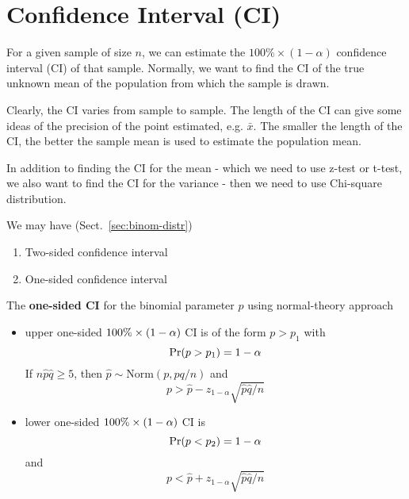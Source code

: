
\chapter{Confidence Interval (CI)}
\label{chap:conf-interv-ci}



For a given sample of size $n$, we can estimate the
$100\%\times(1-\alpha)$ confidence interval (CI) of that
sample. Normally, we want to find the CI of the true unknown mean of
the population from which the sample is drawn. 

Clearly, the CI varies from sample to sample. The length of the CI can
give some ideas of the precision of the point estimated,
e.g. $\bar{x}$. The smaller the length of the CI, the better the
sample mean is used to estimate the population mean. 

In addition to finding the CI for the mean - which we need to use
z-test or t-test, we also want to find the CI for the variance - then
we need to use Chi-square distribution.

We may have (Sect.~\ref{sec:binom-distr})
\begin{enumerate}
\item Two-sided confidence interval
\item One-sided confidence interval
\end{enumerate}

The {\bf one-sided CI} for the binomial parameter $p$ using
normal-theory approach 
\begin{itemize}
\item upper one-sided $100\%\times (1-\alpha)$ CI is of the form $p> p_1$ with
  \begin{equation}
    \label{eq:55}
    \text{Pr}(p > p_1) = 1-\alpha
  \end{equation}
  If $n\hat{p}\hat{q} \ge 5$, then $\hat{p}\sim \text{Norm}(p,pq/n)$ and 
  \begin{equation}
    \label{eq:56}
    p > \hat{p} - z_{1-\alpha} \sqrt{\hat{p}\hat{q}/n}
  \end{equation}
\item lower one-sided $100\%\times (1-\alpha)$ CI is
  \begin{equation}
    \label{eq:57}
    \text{Pr}(p<p_2) = 1-\alpha
  \end{equation}
  and
  \begin{equation}
    \label{eq:58}
    p < \hat{p} + z_{1-\alpha} \sqrt{\hat{p}\hat{q}/n}
  \end{equation}
\end{itemize}

